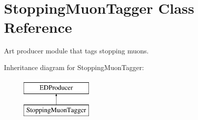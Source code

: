 \hypertarget{classStoppingMuonTagger}{\section{Stopping\-Muon\-Tagger Class Reference}
\label{classStoppingMuonTagger}
}


Art producer module that tags stopping muons.  


Inheritance diagram for Stopping\-Muon\-Tagger\-:\begin{figure}[H]
\begin{center}
\leavevmode
\includegraphics[height=2.000000cm]{classStoppingMuonTagger}
\end{center}
\end{figure}
